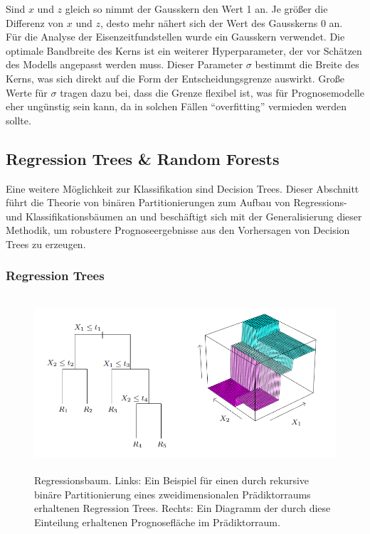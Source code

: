 Sind $x$ und $z$ gleich so nimmt der Gausskern den Wert 1 an. Je größer die Differenz von $x$ und $z$, desto mehr nähert sich der Wert des Gausskerns 0 an. \\ Für die Analyse der Eisenzeitfundstellen wurde ein Gausskern verwendet. Die optimale Bandbreite des Kerns ist ein weiterer Hyperparameter, der vor Schätzen des Modells angepasst werden muss. Dieser Parameter $\sigma$ bestimmt die Breite des Kerns, was sich direkt auf die Form der Entscheidungsgrenze auswirkt. Große Werte für $\sigma$ tragen dazu bei, dass die Grenze flexibel ist, was für Prognosemodelle eher ungünstig sein kann, da in solchen Fällen ``overfitting'' vermieden werden sollte.

\subsection{Regression Trees \& Random Forests}

Eine weitere Möglichkeit zur Klassifikation sind Decision Trees. Dieser Abschnitt führt die Theorie von binären Partitionierungen zum Aufbau von Regressions- und Klassifikationsbäumen an und beschäftigt sich mit der Generalisierung dieser Methodik, um robustere Prognoseergebnisse aus den Vorhersagen von Decision Trees zu erzeugen. 

\subsubsection{Regression Trees}

\begin{figure}[H]
    \centering
    \includegraphics[width = 15cm, height = 6.5cm]{Figures/treesplit.PNG}
    \caption{Regressionsbaum. Links: Ein Beispiel für einen durch rekursive binäre Partitionierung eines zweidimensionalen Prädiktorraums erhaltenen Regression Trees. Rechts: Ein Diagramm der durch diese Einteilung erhaltenen Prognosefläche im Prädiktorraum. \cite{treesplit} }
    \label{treesplit}
\end{figure}

